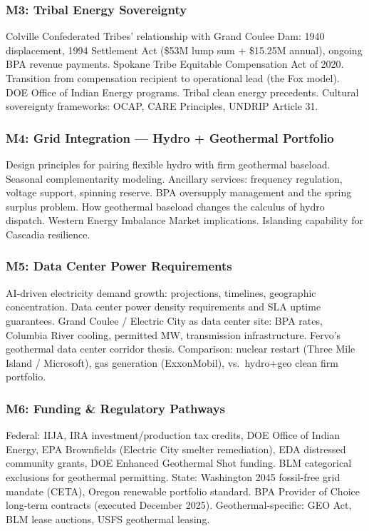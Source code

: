 \documentclass[11pt,letterpaper]{article}
\begin{document}
\subsubsection{M3: Tribal Energy Sovereignty}
Colville Confederated Tribes' relationship with Grand Coulee Dam: 1940 displacement, 1994 Settlement Act (\$53M lump sum + \$15.25M annual), ongoing BPA revenue payments. Spokane Tribe Equitable Compensation Act of 2020. Transition from compensation recipient to operational lead (the Fox model). DOE Office of Indian Energy programs. Tribal clean energy precedents. Cultural sovereignty frameworks: OCAP, CARE Principles, UNDRIP Article 31.

\subsubsection{M4: Grid Integration --- Hydro + Geothermal Portfolio}
Design principles for pairing flexible hydro with firm geothermal baseload. Seasonal complementarity modeling. Ancillary services: frequency regulation, voltage support, spinning reserve. BPA oversupply management and the spring surplus problem. How geothermal baseload changes the calculus of hydro dispatch. Western Energy Imbalance Market implications. Islanding capability for Cascadia resilience.

\subsubsection{M5: Data Center Power Requirements}
AI-driven electricity demand growth: projections, timelines, geographic concentration. Data center power density requirements and SLA uptime guarantees. Grand Coulee / Electric City as data center site: BPA rates, Columbia River cooling, permitted MW, transmission infrastructure. Fervo's geothermal data center corridor thesis. Comparison: nuclear restart (Three Mile Island / Microsoft), gas generation (ExxonMobil), vs.\ hydro+geo clean firm portfolio.

\subsubsection{M6: Funding \& Regulatory Pathways}
Federal: IIJA, IRA investment/production tax credits, DOE Office of Indian Energy, EPA Brownfields (Electric City smelter remediation), EDA distressed community grants, DOE Enhanced Geothermal Shot funding. BLM categorical exclusions for geothermal permitting. State: Washington 2045 fossil-free grid mandate (CETA), Oregon renewable portfolio standard. BPA Provider of Choice long-term contracts (executed December 2025). Geothermal-specific: GEO Act, BLM lease auctions, USFS geothermal leasing.
\end{document}
